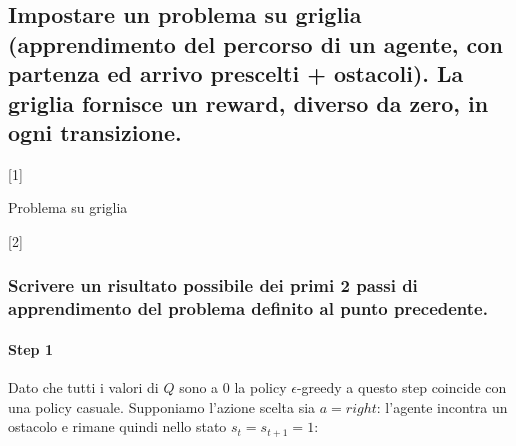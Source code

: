 \documentclass[\main/main.tex]{subfiles}
\begin{document}
\subsection{Impostare un problema su griglia (apprendimento del percorso di un agente, con partenza ed arrivo prescelti + ostacoli). La griglia fornisce un reward, diverso da zero, in ogni transizione.}

[1]{\caption{Problema su griglia}}[2]

\subsubsection{Scrivere un risultato possibile dei primi 2 passi di apprendimento del problema definito al punto precedente.}
\paragraph*{Step 1} Dato che tutti i valori di $Q$ sono a $0$ la policy $\epsilon$-greedy a questo step coincide con una policy casuale. Supponiamo l'azione scelta sia $a=right$: l'agente incontra un ostacolo e rimane quindi nello stato $s_t=s_{t+1}=1$:
\end{document}
